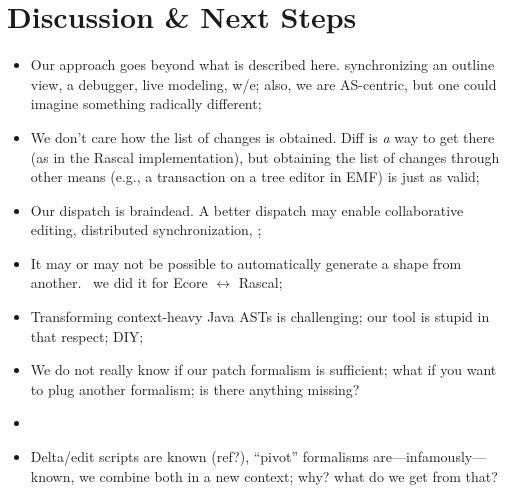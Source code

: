 \documentclass[sigplan]{acmart}
\begin{document}
\section{Discussion \& Next Steps}
\begin{itemize}
	\item Our approach goes beyond what is described here. \eg synchronizing an outline view, a debugger, live modeling, w/e; also, we are AS-centric, but one could imagine something radically different;
	\item We don’t care how the list of changes is obtained. Diff is \emph{a} way to get there (as in the Rascal implementation), but obtaining the list of changes through other means (e.g., a transaction on a tree editor in EMF) is just as valid;
	\item Our dispatch is braindead. A better dispatch may enable collaborative editing, distributed synchronization, \etc;
	\item It may or may not be possible to automatically generate a shape from another. \eg~we did it for Ecore $\leftrightarrow$ Rascal;
	\item Transforming context-heavy Java ASTs is challenging; our tool is stupid in that respect; DIY;
	\item We do not really know if our patch formalism is sufficient; what if you want to plug another formalism; is there anything missing?
	\item \cite{lammel2005mappings}
	\item Delta/edit scripts are known (ref?), ``pivot'' formalisms are---infamously---known, we combine both in a new context; why? what do we get from that?
\end{itemize}

\clearpage
\balance


\end{document}
